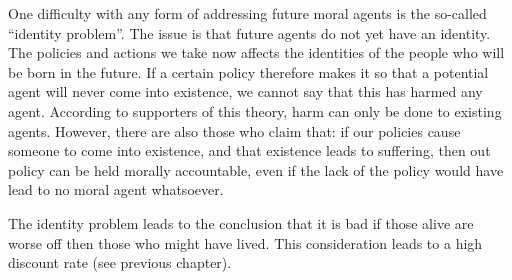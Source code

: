 \documentclass[12pt]{report}
\begin{document}
One difficulty with any form of addressing future moral agents is the so-called
``identity problem''. The issue is that future agents do not yet have an
identity. The policies and actions we take now affects the identities of the
people who will be born in the future. If a certain policy therefore makes it so
that a potential agent will never come into existence, we cannot say that this
has harmed any agent. According to supporters of this theory, harm can only be
done to existing agents. However, there are also those who claim that: if our
policies cause someone to come into existence, and that existence leads to
suffering, then out policy can be held morally accountable, even if the lack of
the policy would have lead to no moral agent whatsoever.

The identity problem leads to the conclusion that it is bad if those alive are
worse off then those who might have lived. This consideration leads to a high
discount rate (see previous chapter).
\end{document}
